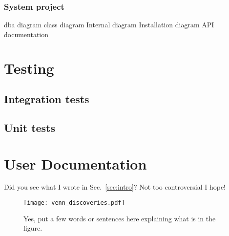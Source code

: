 \documentclass[12pt,a4paper]{article}
\begin{document}
\subsubsection{System project}
dba diagram
class diagram
Internal diagram
Installation diagram
API documentation

\section{Testing}
\subsection{Integration tests}
\subsection{Unit tests}

\section{User Documentation}

Did you see what I wrote in Sec.~\ref{sec:intro}? Not too controversial I hope!

\begin{figure}[htbp!]
    \begin{center}
        \texttt{[image: venn\_discoveries.pdf]}
    \end{center}
    \caption{Yes, put a few words or sentences here explaining what is in the figure.}
    \label{fig:venn}
\end{figure}



\end{document}
